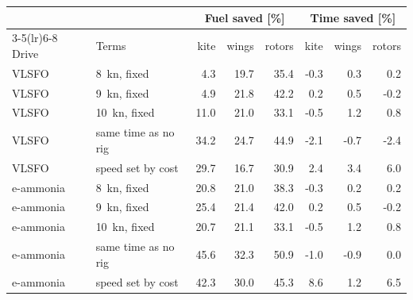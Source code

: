 \begin{tabular}{@{}llrrrrrr@{}}
\toprule
 & & \multicolumn{3}{c}{Fuel saved [\%]} & \multicolumn{3}{c}{Time saved [\%]} \\
\cmidrule(lr){3-5}\cmidrule(lr){6-8}
Drive & Terms & kite & wings & rotors & kite & wings & rotors \\
\midrule
VLSFO & \SI{8}{kn}, fixed & \cellcolor{gain!3}4.3 & \cellcolor{gain!15}19.7 & \cellcolor{gain!28}35.4 & \cellcolor{loss!1}-0.3 & \cellcolor{gain!1}0.3 & \cellcolor{gain!1}0.2 \\
VLSFO & \SI{9}{kn}, fixed & \cellcolor{gain!4}4.9 & \cellcolor{gain!17}21.8 & \cellcolor{gain!33}42.2 & \cellcolor{gain!1}0.2 & \cellcolor{gain!2}0.5 & \cellcolor{loss!1}-0.2 \\
VLSFO & \SI{10}{kn}, fixed & \cellcolor{gain!9}11.0 & \cellcolor{gain!16}21.0 & \cellcolor{gain!26}33.1 & \cellcolor{loss!2}-0.5 & \cellcolor{gain!6}1.2 & \cellcolor{gain!3}0.8 \\
VLSFO & same time as no rig & \cellcolor{gain!27}34.2 & \cellcolor{gain!19}24.7 & \cellcolor{gain!35}44.9 & \cellcolor{loss!10}-2.1 & \cellcolor{loss!3}-0.7 & \cellcolor{loss!11}-2.4 \\
VLSFO & speed set by cost & \cellcolor{gain!23}29.7 & \cellcolor{gain!13}16.7 & \cellcolor{gain!24}30.9 & \cellcolor{gain!11}2.4 & \cellcolor{gain!16}3.4 & \cellcolor{gain!28}6.0 \\
e-ammonia & \SI{8}{kn}, fixed & \cellcolor{gain!16}20.8 & \cellcolor{gain!17}21.0 & \cellcolor{gain!30}38.3 & \cellcolor{loss!1}-0.3 & \cellcolor{gain!1}0.2 & \cellcolor{gain!1}0.2 \\
e-ammonia & \SI{9}{kn}, fixed & \cellcolor{gain!20}25.4 & \cellcolor{gain!17}21.4 & \cellcolor{gain!33}42.0 & \cellcolor{gain!1}0.2 & \cellcolor{gain!2}0.5 & \cellcolor{loss!1}-0.2 \\
e-ammonia & \SI{10}{kn}, fixed & \cellcolor{gain!16}20.7 & \cellcolor{gain!17}21.1 & \cellcolor{gain!26}33.1 & \cellcolor{loss!2}-0.5 & \cellcolor{gain!6}1.2 & \cellcolor{gain!3}0.8 \\
e-ammonia & same time as no rig & \cellcolor{gain!36}45.6 & \cellcolor{gain!25}32.3 & \cellcolor{gain!40}50.9 & \cellcolor{loss!5}-1.0 & \cellcolor{loss!4}-0.9 & \cellcolor{gain!0}0.0 \\
e-ammonia & speed set by cost & \cellcolor{gain!33}42.3 & \cellcolor{gain!24}30.0 & \cellcolor{gain!36}45.3 & \cellcolor{gain!40}8.6 & \cellcolor{gain!6}1.2 & \cellcolor{gain!30}6.5 \\
\bottomrule
\end{tabular}
